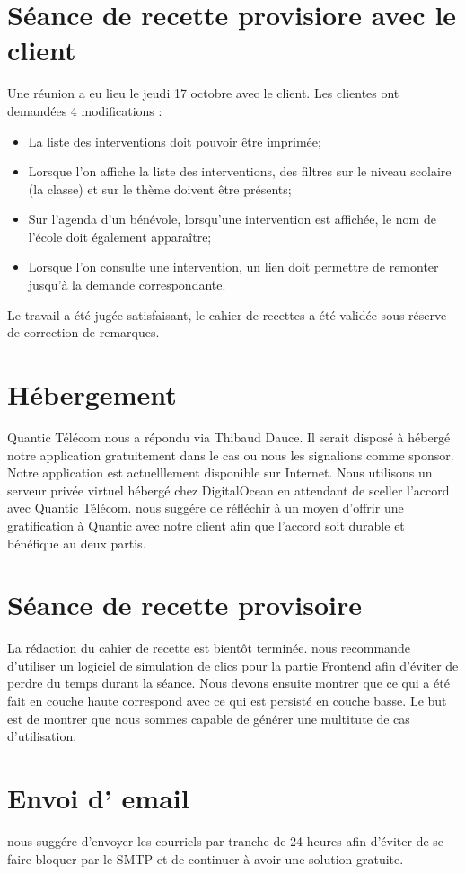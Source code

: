 \documentclass [a4paper] {article}
\begin{document}
\section{Séance de recette provisiore avec le client}
Une réunion a eu lieu le jeudi 17 octobre avec le client. Les clientes ont demandées 4 modifications : 
\begin{itemize}
	\item	La liste des interventions doit pouvoir être imprimée;
	\item	Lorsque l'on affiche la liste des interventions, des filtres sur le niveau scolaire (la classe) et sur le thème doivent être présents;
	\item	Sur l'agenda d'un bénévole, lorsqu'une intervention est affichée, le nom de l'école doit également apparaître;
	\item	Lorsque l'on consulte une intervention, un lien doit permettre de remonter jusqu'à la demande correspondante.
\end{itemize} 
Le travail a été jugée satisfaisant, le cahier de recettes a été validée sous réserve de correction de remarques.

\section{Hébergement}
Quantic Télécom nous a répondu via Thibaud Dauce. Il serait disposé à hébergé notre application gratuitement dans le cas ou nous les signalions comme sponsor. Notre application est actuelllement disponible sur Internet. Nous utilisons un serveur privée virtuel hébergé chez DigitalOcean en attendant de sceller l'accord avec Quantic Télécom. \nomTuteurPedago{} nous suggére de réfléchir à un moyen d'offrir une gratification à Quantic avec notre client afin que l'accord soit durable et bénéfique au deux partis.

\section{Séance de recette provisoire}
La rédaction du cahier de recette est bientôt terminée. \nomTuteurPedago{} nous recommande d'utiliser un logiciel de simulation de clics pour la partie Frontend afin d'éviter de perdre du temps durant la séance. Nous devons ensuite montrer que ce qui a été fait en couche haute correspond avec ce qui est persisté en couche basse. Le but est de montrer que nous sommes capable de générer une multitute de cas d'utilisation.

\section{Envoi d' email}
\nomTuteurPedago{} nous suggére d'envoyer les courriels par tranche de 24 heures afin d'éviter de se faire bloquer par le SMTP et de continuer à avoir une solution gratuite.
\newpage
\end{document}
